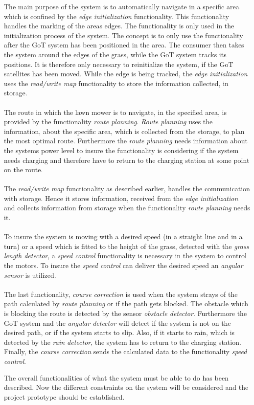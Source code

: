 \noindent
The main purpose of the system is to automatically navigate in a specific area which is confined by the \textit{edge initialization} functionality. This functionality handles the marking of the areas edges. The functionality is only used in the initialization process of the system. The concept is to only use the functionality after the GoT system has been positioned in the area. The consumer then takes the system around the edges of the grass, while the GoT system tracks its positions. It is therefore only necessary to reinitialize the system, if the GoT satellites has been moved. While the edge is being tracked, the \textit{edge initialization} uses the \textit{read/write map} functionality to store the information collected, in storage. \\\\ 
\noindent
The route in which the lawn mower is to navigate, in the specified area, is provided by the functionality \textit{route planning}. \textit{Route planning} uses the information, about the specific area, which is collected from the storage, to plan the most optimal route. Furthermore the \textit{route planning} needs information about the systems power level to insure the functionality is considering if the system needs charging and therefore have to return to the charging station at some point on the route.\\\\
\noindent
The \textit{read/write map} functionality as described earlier, handles the communication with storage. Hence it stores information, received from the \textit{edge initialization} and collects information from storage when the functionality \textit{route planning} needs it. \\\\
\noindent
To insure the system is moving with a desired speed (in a straight line and in a turn) or a speed which is fitted to the height of the grass, detected with the \textit{grass length detector}, a \textit{speed control} functionality is necessary in the system to control the motors. To insure the \textit{speed control} can deliver the desired speed an \textit{angular sensor} is utilized. \\\\
\noindent
The last functionality, \textit{course correction} is used when the system strays of the path calculated by \textit{route planning} or if the path gets blocked.
The obstacle which is blocking the route is detected by the sensor \textit{obstacle detector}. Furthermore the GoT system and the \textit{angular detector} will detect if the system is not on the desired path, or if the system starts to slip. Also, if it starts to rain, which is detected by the \textit{rain detector}, the system has to return to the charging station.
Finally, the \textit{course correction} sends the calculated data to the functionality \textit{speed control}.

The overall functionalities of what the system must be able to do has been described. Now the different constraints on the system will be considered and the project prototype should be established.